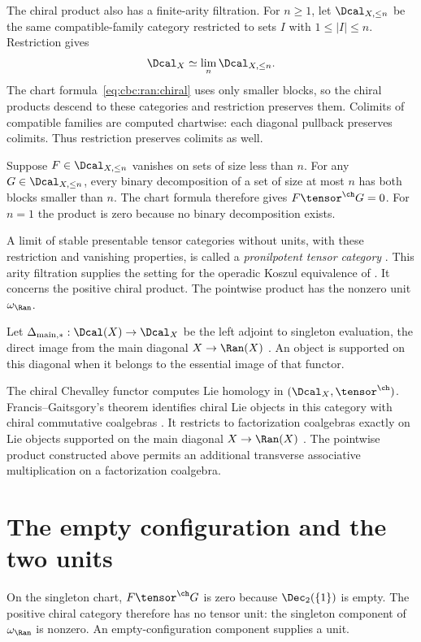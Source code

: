 The chiral product also has a finite-arity filtration.
For $n\geq1$, let $\Dcal_{X,\leq n}$ be the same compatible-family
category restricted to sets $I$ with $1\leq|I|\leq n$.
Restriction gives
\[
 \Dcal_X\simeq\lim_n\Dcal_{X,\leq n}.
\]
The chart formula~\eqref{eq:cbc:ran:chiral} uses only smaller blocks,
so the chiral products descend to these categories and restriction
preserves them. Colimits of compatible families are computed chartwise:
each diagonal pullback preserves colimits.
Thus restriction preserves colimits as well.

Suppose $F\in\Dcal_{X,\leq n}$ vanishes on sets of size less than $n$.
For any $G\in\Dcal_{X,\leq n}$, every binary decomposition of a set
of size at most $n$ has both blocks smaller than $n$.
The chart formula therefore gives $F\tensor^{\ch}G=0$.
For $n=1$ the product is zero because no binary decomposition exists.

A limit of stable presentable tensor categories without units, with
these restriction and vanishing properties, is called a
\emph{pronilpotent tensor category}
\cite[Definition 14.10]{Heuts}.
This arity filtration supplies the setting for the operadic Koszul
equivalence of \cite[Theorem 14.13]{Heuts}.
It concerns the positive chiral product.
The pointwise product has the nonzero unit $\omega_{\Ran}$.

Let $\Delta_{\mathrm{main},*}:\Dcal(X)\to\Dcal_X$ be the left adjoint
to singleton evaluation, the direct image from the main diagonal
$X\to\Ran(X)$ \cite[\S2.1.5]{FG12}. An object is supported on this
diagonal when it belongs to the essential image of that functor.

The chiral Chevalley functor computes Lie homology in
$(\Dcal_X,\tensor^{\ch})$. Francis--Gaitsgory's theorem identifies
chiral Lie objects in this category with chiral commutative coalgebras
\cite[Theorems 1.2.4 and 5.1.1]{FG12}.
It restricts to factorization coalgebras exactly on Lie objects
supported on the main diagonal $X\to\Ran(X)$
\cite[Theorem 5.2.1]{FG12}.
The pointwise product constructed above permits an additional
transverse associative multiplication on a factorization coalgebra.

\section{The empty configuration and the two units}
On the singleton chart, $F\tensor^{\ch}G$ is zero because
$\Dec_2(\{1\})$ is empty. The positive chiral category therefore
has no tensor unit: the singleton component of $\omega_{\Ran}$ is nonzero.
An empty-configuration component supplies a unit.

